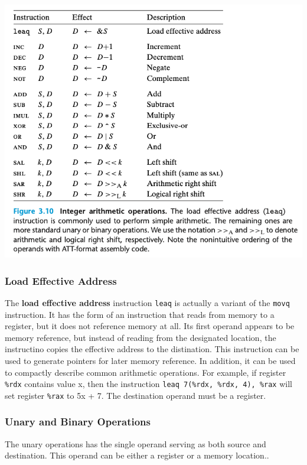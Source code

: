 \documentclass[11pt]{article}
\begin{document}
\begin{center}
\includegraphics[width=.9\linewidth]{pics/integer-arithmetic-operation.png}
\end{center}


\subsubsection{Load Effective Address}
\label{sec:orga201c49}
The \textbf{load effective address} instruction \texttt{leaq} is actually a variant of the \texttt{movq} instruction. It has the form of an instruction that reads from memory to a register, but it does not reference memory at all. Its first operand appears to be memory reference, but instead of reading from the designated location, the instructino copies the effective address to the distination. This instruction can be used to generate pointers for later memory reference. In addition, it can be used to compactly describe common arithmetic operations. For example, if register \texttt{\%rdx} contains value x, then the instruction \texttt{leaq 7(\%rdx, \%rdx, 4), \%rax} will set register \texttt{\%rax} to 5x + 7. The destination operand must be a register.\\


\subsubsection{Unary and Binary Operations}
\label{sec:orgb17023b}

The unary operations has the single operand serving as both source and destination. This operand can be either a register or a memory location..\\
\end{document}
